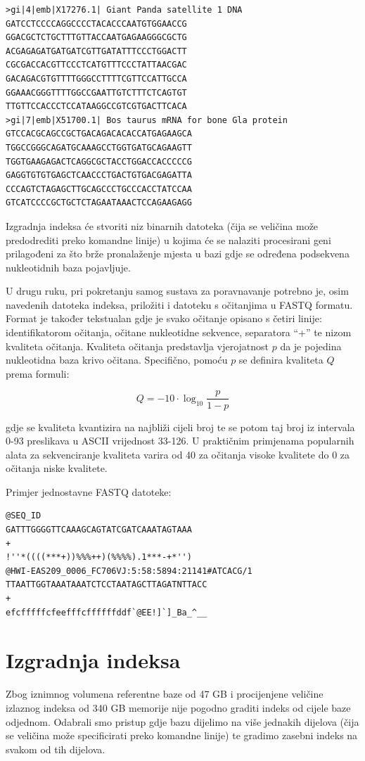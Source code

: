 \documentclass[times, utf8, diplomski]{fer}
\begin{document}
\begin{verbatim}
>gi|4|emb|X17276.1| Giant Panda satellite 1 DNA
GATCCTCCCCAGGCCCCTACACCCAATGTGGAACCG
GGACGCTCTGCTTTGTTACCAATGAGAAGGGCGCTG
ACGAGAGATGATGATCGTTGATATTTCCCTGGACTT
CGCGACCACGTTCCCTCATGTTTCCCTATTAACGAC
GACAGACGTGTTTTGGGCCTTTTCGTTCCATTGCCA
GGAAACGGGTTTTGGCCGAATTGTCTTTCTCAGTGT
TTGTTCCACCCTCCATAAGGCCGTCGTGACTTCACA
>gi|7|emb|X51700.1| Bos taurus mRNA for bone Gla protein
GTCCACGCAGCCGCTGACAGACACACCATGAGAAGCA
TGGCCGGGCAGATGCAAAGCCTGGTGATGCAGAAGTT
TGGTGAAGAGACTCAGGCGCTACCTGGACCACCCCCG
GAGGTGTGTGAGCTCAACCCTGACTGTGACGAGATTA
CCCAGTCTAGAGCTTGCAGCCCTGCCCACCTATCCAA
GTCATCCCCGCTGCTCTAGAATAAACTCCAGAAGAGG
\end{verbatim}

Izgradnja indeksa će stvoriti niz binarnih datoteka (čija se veličina može predodrediti preko komandne linije)
u kojima će se nalaziti procesirani geni prilagođeni za što brže pronalaženje mjesta u bazi gdje se određena
podsekvena nukleotidnih baza pojavljuje.

U drugu ruku, pri pokretanju samog sustava za poravnavanje potrebno je, osim navedenih datoteka indeksa, priložiti
i datoteku s očitanjima u FASTQ formatu. Format je također tekstualan gdje je svako očitanje opisano s četiri linije: identifikatorom očitanja, očitane nukleotidne sekvence, separatora ``+'' te nizom kvaliteta očitanja.
Kvaliteta očitanja predstavlja vjerojatnost $p$ da je pojedina nukleotidna baza krivo očitana. Specifično,
pomoću $p$ se definira kvaliteta $Q$ prema formuli:

$$ Q = -10 \cdot \log_{10}{\frac{p}{1-p}} $$

\noindent gdje se kvaliteta kvantizira na najbliži cijeli broj te se potom taj broj iz intervala 0-93 preslikava 
u ASCII vrijednost 33-126. U praktičnim primjenama popularnih alata za sekvenciranje kvaliteta varira od 40 za
očitanja visoke kvalitete do 0 za očitanja niske kvalitete.

Primjer jednostavne FASTQ datoteke:
\begin{verbatim}
@SEQ_ID
GATTTGGGGTTCAAAGCAGTATCGATCAAATAGTAAA
+
!''*((((***+))%%%++)(%%%%).1***-+*'')
@HWI-EAS209_0006_FC706VJ:5:58:5894:21141#ATCACG/1
TTAATTGGTAAATAAATCTCCTAATAGCTTAGATNTTACC
+
efcfffffcfeefffcffffffddf`@EE!]`]_Ba_^__
\end{verbatim}

\section{Izgradnja indeksa}
Zbog iznimnog volumena referentne baze od 47 GB i procijenjene veličine izlaznog indeksa od 340 GB memorije nije
pogodno graditi indeks od cijele baze odjednom. Odabrali smo pristup gdje bazu dijelimo na više jednakih dijelova
(čija se veličina može specificirati preko komandne linije) te gradimo zasebni indeks na svakom od tih dijelova.
\end{document}
